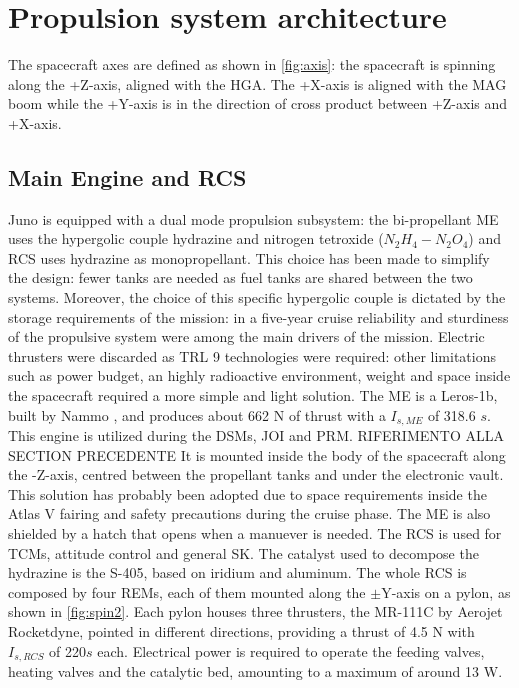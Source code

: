 \section{Propulsion system architecture}
\label{sec:prop_architecture}


The spacecraft axes are defined as shown in \autoref{fig:axis}: the spacecraft is spinning along the +Z-axis, aligned with the HGA. The +X-axis is aligned with the MAG boom while the +Y-axis is in the direction of cross product between +Z-axis and +X-axis.


\subsection{Main Engine and RCS}
\label{sec:me and rcs}
Juno is equipped with a dual mode propulsion subsystem: the bi-propellant ME uses the hypergolic couple hydrazine and nitrogen tetroxide ($N_2H_4 - N_2O_4$) and RCS uses hydrazine as monopropellant. This choice has been made to simplify the design: fewer tanks are needed as fuel tanks are shared between the two systems. Moreover, the choice of this specific hypergolic couple is dictated by the storage requirements of the mission: in a five-year cruise reliability and sturdiness of the propulsive system were among the main drivers of the mission. Electric thrusters were discarded as TRL 9 technologies were required: other limitations such as power budget, an highly radioactive environment, weight and space inside the spacecraft required a more simple and light solution.  
The ME is a Leros-1b, built by Nammo \cite{Leros}, and produces about 662 N of thrust with a $I_{s, ME}$ of 318.6 \;$s$. This engine is utilized during the DSMs, JOI and PRM. RIFERIMENTO ALLA SECTION PRECEDENTE It is mounted inside the body of the spacecraft along the -Z-axis, centred between the propellant tanks and under the electronic vault. This solution has probably been adopted due to space requirements inside the Atlas V fairing and safety precautions during the cruise phase. The ME is also shielded by a hatch that opens when a manuever is needed.
The RCS is used for TCMs, attitude control and general SK. The catalyst used to decompose the hydrazine is the S-405, based on iridium and aluminum\cite{s405}.
The whole RCS is composed by four REMs, each of them mounted along the $\pm$Y-axis on a pylon, as shown in \autoref{fig:spin2}. Each pylon houses three thrusters, the MR-111C by Aerojet Rocketdyne\cite{RCS_info}, pointed in different directions, providing a thrust of 4.5 N with $I_{s, RCS}$ of 220\;$s$ each. Electrical power is required to operate the feeding valves, heating valves and the catalytic bed, amounting to a maximum of around 13 W\cite{RCS_values}. 

